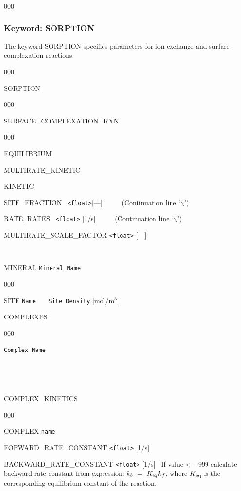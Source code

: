 \begin{deflist}{000}
\hfill\hyperlink{target_key}{\return}
\clearpage
\protect\hypertarget{target_chem_sorb}{}

\subsubsection{Keyword: SORPTION}

The keyword SORPTION specifies parameters for ion-exchange and surface-complexation reactions.

\hfill\hyperlink{target_key}{\return}

\begin{deflist}{000}
\item[SORPTION] ~
\begin{deflist}{000}
\item[SURFACE\_COMPLEXATION\_RXN] ~

\begin{deflist}{000}
\item[EQUILIBRIUM]

\item[MULTIRATE\_KINETIC]

\item[KINETIC]


\item [SITE\_FRACTION] \ {\tt <float>}[---] \ \ \ \ \ (Continuation line `$\backslash$')
\item [RATE, RATES] \ {\tt <float>} [1/s] \ \ \ \ \ (Continuation line `$\backslash$')
\item [MULTIRATE\_SCALE\_FACTOR] {\tt <float>} [---]

~\\

\item [MINERAL] {\tt Mineral Name}
\begin{deflist}{000}
\item[SITE] {\tt Name} \ \ \ {\tt Site Density} [mol/m$^3$]
\item[COMPLEXES] ~
\begin{deflist}{000}
\item[\tt Complex Name]
\end{deflist}
\item [\keyend] ~

~\\

\item[COMPLEX\_KINETICS] ~
\begin{deflist}{000}
\item[COMPLEX] {\tt name}
\item[FORWARD\_RATE\_CONSTANT] {\tt <float>} [1/s]
\item[BACKWARD\_RATE\_CONSTANT] {\tt <float>} [1/s] \ If value < $-$999 calculate backward rate constant from expression: $k_b \ =\  K_{\rm eq} k_f$, where $K_{\rm eq}$ is the corresponding equilibrium constant of the reaction.
\end{deflist}
\item [\keyend] ~
\end{deflist}
\item [\keyend] ~


\end{deflist}
\end{deflist}
\end{deflist}
\end{deflist}
